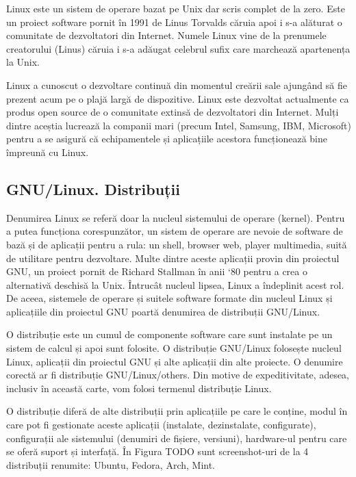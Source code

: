 Linux este un sistem de operare bazat pe Unix dar scris complet de la zero. Este un proiect software pornit în 1991 de Linus Torvalds căruia apoi i s-a alăturat o comunitate de dezvoltatori din Internet. Numele Linux vine de la prenumele creatorului (Linus) căruia i s-a adăugat celebrul sufix care marchează apartenența la Unix.

Linux a cunoscut o dezvoltare continuă din momentul creării sale ajungând să fie prezent acum pe o plajă largă de dispozitive. Linux este dezvoltat actualmente ca produs open source de o comunitate extinsă de dezvoltatori din Internet. Mulți dintre aceștia lucrează la companii mari (precum Intel, Samsung, IBM, Microsoft) pentru a se asigură că echipamentele și aplicațiile acestora funcționează bine împreună cu Linux.

\subsection{GNU/Linux. Distribuții}
\label{sec:intro:distros}

Denumirea Linux se referă doar la nucleul sistemului de operare (kernel). Pentru a putea funcționa corespunzător, un sistem de operare are nevoie de software de bază și de aplicații pentru a rula: un shell, browser web, player multimedia, suită de utilitare pentru dezvoltare. Multe dintre aceste aplicații provin din proiectul GNU, un proiect pornit de Richard Stallman în anii ‘80 pentru a crea o alternativă deschisă la Unix. Întrucât nucleul lipsea, Linux a îndeplinit acest rol. De aceea, sistemele de operare și suitele software formate din nucleul Linux și aplicațiile din proiectul GNU poartă denumirea de distribuții GNU/Linux.

O distribuție este un cumul de componente software care sunt instalate pe un sistem de calcul și apoi sunt folosite. O distribuție GNU/Linux folosește nucleul Linux, aplicații din proiectul GNU și alte aplicații din alte proiecte. O denumire corectă ar fi distribuție GNU/Linux/others. Din motive de expeditivitate, adesea, inclusiv în această carte, vom folosi termenul distribuție Linux.

O distribuție diferă de alte distribuții prin aplicațiile pe care le conține, modul în care pot fi gestionate aceste aplicații (instalate, dezinstalate, configurate), configurații ale sistemului (denumiri de fișiere, versiuni), hardware-ul pentru care se oferă suport și interfață. În Figura TODO sunt screenshot-uri de la 4 distribuții renumite: Ubuntu, Fedora, Arch, Mint.

